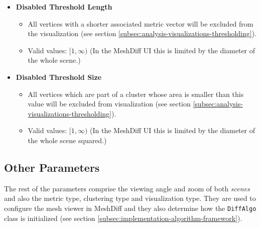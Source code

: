 \begin{itemize}
\item {\bf Disabled Threshold Length}
	\begin{itemize}
		\item All vertices with a shorter associated metric vector will be excluded from the visualization (see section \ref{subsec:analysis-visualizations-thresholding}).
		\item Valid values: \([1, \infty)\) (In the MeshDiff UI this is limited by the diameter of the whole scene.)
	\end{itemize} 

\item {\bf Disabled Threshold Size}
	\begin{itemize}
		\item All vertices which are part of a cluster whose area is smaller than this value will be excluded from visualization (see section \ref{subsec:analysis-visualizations-thresholding}).
		\item Valid values: \([1, \infty)\) (In the MeshDiff UI this is limited by the diameter of the whole scene squared.)
	\end{itemize}
\end{itemize}

\subsection{Other Parameters}
\label{attch:parameter_desc-other_parameters}

The rest of the parameters comprise the viewing angle and zoom of both {\it scenes} and also the metric type, clustering type and visualization type. They are used to configure the mesh viewer in MeshDiff and they also determine how the \verb+DiffAlgo+ class is initialized (see section \ref{subsec:implementation-algorithm-framework}).

